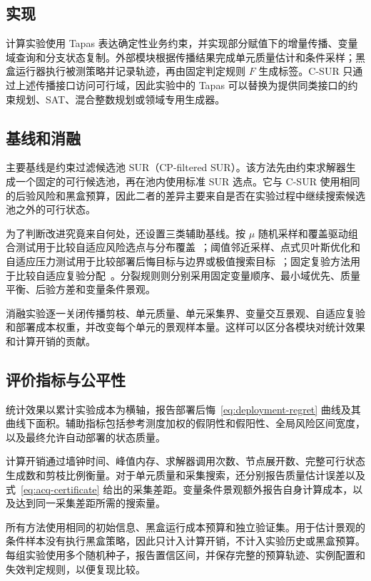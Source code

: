 \documentclass[UTF8,11pt,a4paper,fontset=none]{ctexart}
\newcommand{\1}{\mathbf 1}
\begin{document}
\subsection{实现}

计算实验使用 Tapas 表达确定性业务约束，并实现部分赋值下的增量传播、变量域查询和分支状态复制。外部模块根据传播结果完成单元质量估计和条件采样；黑盒运行器执行被测策略并记录轨迹，再由固定判定规则 $F$ 生成标签。C-SUR 只通过上述传播接口访问可行域，因此实验中的 Tapas 可以替换为提供同类接口的约束规划、SAT、混合整数规划或领域专用生成器。

\subsection{基线和消融}

主要基线是约束过滤候选池 SUR（CP-filtered SUR）。该方法先由约束求解器生成一个固定的可行候选池，再在池内使用标准 SUR 选点。它与 C-SUR 使用相同的后验风险和黑盒预算，因此二者的差异主要来自是否在实验过程中继续搜索候选池之外的可行状态。

为了判断改进究竟来自何处，还设置三类辅助基线。按 $\mu$ 随机采样和覆盖驱动组合测试用于比较自适应风险选点与分布覆盖~\cite{wu2019}；阈值邻近采样、点式贝叶斯优化和自适应压力测试用于比较部署后悔目标与边界或极值搜索目标~\cite{gotovos2013,bogunovic2016,corso2021,lee2020}；固定复验方法用于比较自适应复验分配~\cite{chen2000,song2021}。分裂规则则分别采用固定变量顺序、最小域优先、质量平衡、后验方差和变量条件景观。

消融实验逐一关闭传播剪枝、单元质量、单元采集界、变量交互景观、自适应复验和部署成本权重，并改变每个单元的景观样本量。这样可以区分各模块对统计效果和计算开销的贡献。

\subsection{评价指标与公平性}

统计效果以累计实验成本为横轴，报告部署后悔~\eqref{eq:deployment-regret} 曲线及其曲线下面积。辅助指标包括参考测度加权的假阴性和假阳性、全局风险区间宽度，以及最终允许自动部署的状态质量。

计算开销通过墙钟时间、峰值内存、求解器调用次数、节点展开数、完整可行状态生成数和剪枝比例衡量。对于单元质量和采集搜索，还分别报告质量估计误差以及式~\eqref{eq:acq-certificate} 给出的采集差距。变量条件景观额外报告自身计算成本，以及达到同一采集差距所需的搜索量。

所有方法使用相同的初始信息、黑盒运行成本预算和独立验证集。用于估计景观的条件样本没有执行黑盒策略，因此只计入计算开销，不计入实验历史或黑盒预算。每组实验使用多个随机种子，报告置信区间，并保存完整的预算轨迹、实例配置和失效判定规则，以便复现比较。
\end{document}
